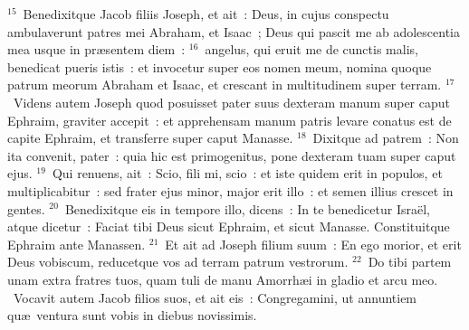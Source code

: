 ${}^{15}$~Benedixitque Jacob filiis Joseph, et ait~: Deus, in cujus conspectu ambulaverunt patres mei Abraham, et Isaac~; Deus qui pascit me ab adolescentia mea usque in pr\ae sentem diem~:
${}^{16}$~angelus, qui eruit me de cunctis malis, benedicat pueris istis~: et invocetur super eos nomen meum, nomina quoque patrum meorum Abraham et Isaac, et crescant in multitudinem super terram.
${}^{17}$~Videns autem Joseph quod posuisset pater suus dexteram manum super caput Ephraim, graviter accepit~: et apprehensam manum patris levare conatus est de capite Ephraim, et transferre super caput Manasse.
${}^{18}$~Dixitque ad patrem~: Non ita convenit, pater~: quia hic est primogenitus, pone dexteram tuam super caput ejus.
${}^{19}$~Qui renuens, ait~: Scio, fili mi, scio~: et iste quidem erit in populos, et multiplicabitur~: sed frater ejus minor, major erit illo~: et semen illius crescet in gentes.
${}^{20}$~Benedixitque eis in tempore illo, dicens~: In te benedicetur Isra\"el, atque dicetur~: Faciat tibi Deus sicut Ephraim, et sicut Manasse. Constituitque Ephraim ante Manassen.
${}^{21}$~Et ait ad Joseph filium suum~: En ego morior, et erit Deus vobiscum, reducetque vos ad terram patrum vestrorum.
${}^{22}$~Do tibi partem unam extra fratres tuos, quam tuli de manu Amorrh\ae i in gladio et arcu meo.
~Vocavit autem Jacob filios suos, et ait eis~: Congregamini, ut annuntiem qu\ae\ ventura sunt vobis in diebus novissimis.
